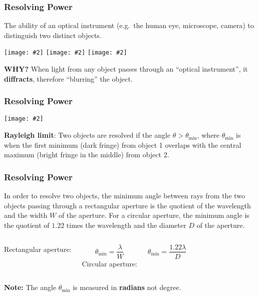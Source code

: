 \documentclass[compress,aspectratio=169]{beamer}
\newcommand{\pic}[2]{\texttt{[image: \#2]}}
\begin{document}
\begin{frame}
  \frametitle{Resolving Power}
  The ability of an optical instrument (e.g.\ the human eye, microscope,
  camera) to distinguish two distinct objects.
  \begin{center}
    \pic{.322}{resolve1.png}\hspace{.05in}
    \pic{.322}{resolve2.png}\hspace{.05in}
    \pic{.322}{resolve3.png}\hspace{.05in}
  \end{center}
  \textbf{WHY?} When light from any object passes through an 
  ``optical instrument'', it \textbf{diffracts}, therefore ``blurring'' the
  object.
\end{frame}

\begin{frame}
  \frametitle{Resolving Power}
  \begin{minipage}{.55\textwidth}
      \pic{.95}{resolve4.png}
  \end{minipage}
  \begin{minipage}{.42\textwidth}
    \textbf{Rayleigh limit}: Two objects are resolved if the angle
    $\theta>\theta_\mathrm{min}$, where $\theta_\mathrm{min}$ is when the first
    minimum (dark fringe) from object 1 overlaps with the central maximum
    (bright fringe in the middle) from object 2.
  \end{minipage}
\end{frame}
\begin{frame}
  \frametitle{Resolving Power}
  In order to resolve two objects, the minimum angle between rays from the two
  objects passing through a rectangular aperture is the quotient of the
  wavelength and the width $W$ of the aperture. For a circular aperture, the
  minimum angle is the quotient of $1.22$ times the wavelength and the diameter
  $D$ of the aperture.
  \vspace{.2in}
  \begin{columns}
    Rectangular aperture:

    \vspace{-.3in}
    {\Huge
      \begin{displaymath}
        \boxed{\theta_\mathrm{min}=\frac{\lambda}{W}}
      \end{displaymath}
    }
    Circular aperture:

    \vspace{-.3in}
    {\Huge
      \begin{displaymath}
        \boxed{\theta_\mathrm{min}=\frac{1.22\lambda}{D}}
      \end{displaymath}
    }
  \end{columns}
  \textbf{Note:} The angle $\theta_\mathrm{min}$ is measured in \textbf{radians}
  not degree.
\end{frame}
\end{document}
